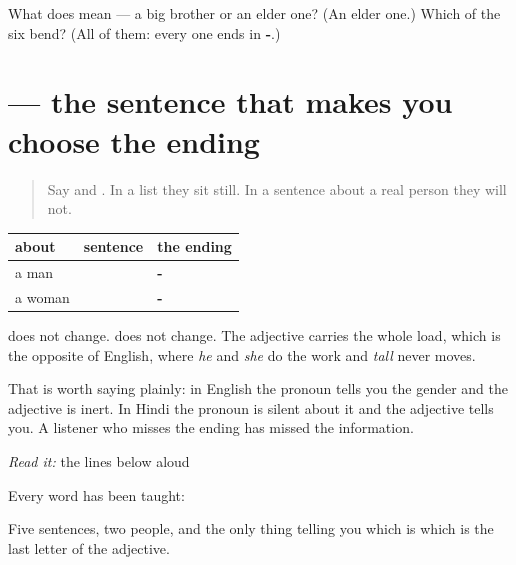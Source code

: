 \begin{tcolorbox}[breakable,colback=teal!4,colframe=teal!35!black,title={Before you move on}]
What does \textbf{ } mean — a big brother or an elder one? (An elder one.) Which of the six bend? (All of them: every one ends in \textbf{-}.)
\end{tcolorbox}
\section[\texorpdfstring{\hi{वह} \hi{लंबी} \hi{है} (vah lambī hai)}{वह लंबी है (vah lambī hai)}]{   — the sentence that makes you choose the ending}

\label{lesson:HI-C82-sintesis-shareer}



\begin{quote}
Say \textbf{} and \textbf{}. In a list they sit still. In a sentence about a real person they will not.
\end{quote}

\begin{grammarlens}[title={Grammar Lens: the ending is chosen by who you are talking about}]
\noindent
\begin{tabularx}{\linewidth}{@{}>{\raggedright\arraybackslash}X>{\raggedright\arraybackslash}X>{\raggedright\arraybackslash}X@{}}
\toprule
\textbf{about} & \textbf{sentence} & \textbf{the ending} \\
\midrule
a man & \hi{वह} \hi{लंबा} \hi{है} & \textbf{-\hi{आ}} \\
a woman & \hi{वह} \hi{लंबी} \hi{है} & \textbf{-\hi{ई}} \\
\bottomrule
\end{tabularx}

\textbf{} does not change. \textbf{} does not change. The adjective carries the whole load, which is the opposite of English, where \emph{he} and \emph{she} do the work and \emph{tall} never moves.

That is worth saying plainly: in English the pronoun tells you the gender and the adjective is inert. In Hindi the pronoun is silent about it and the adjective tells you. A listener who misses the ending has missed the information.
\end{grammarlens}

\begin{tcolorbox}[breakable,skin=enhanced,colback=orange!6,colframe=orange!45!black,boxrule=0.5pt,arc=1mm,left=6pt,right=6pt,top=4pt,bottom=4pt,fonttitle=\bfseries,title={Read this}]
\emph{Read it:} the lines below aloud

Every word has been taught:

\begin{quote}
              
\end{quote}

Five sentences, two people, and the only thing telling you which is which is the last letter of the adjective.
\end{tcolorbox}

